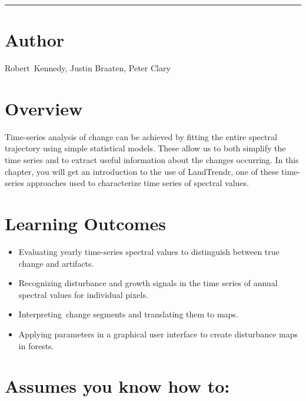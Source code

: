 \documentclass[
  letterpaper,
  DIV=11,
  numbers=noendperiod]{scrreprt}
\providecommand{\tightlist}{%
  \setlength{\itemsep}{0pt}\setlength{\parskip}{0pt}}\usepackage{longtable,booktabs,array}
\begin{document}
\begin{center}\rule{0.5\linewidth}{0.5pt}\end{center}

\hypertarget{author-10}{%
\section*{Author}\label{author-10}}


Robert~Kennedy, Justin Braaten, Peter Clary

\hypertarget{overview-12}{%
\section*{Overview}\label{overview-12}}


Time-series analysis of change can be achieved by fitting the entire
spectral trajectory using simple statistical models. These allow us to
both simplify the time series and to extract useful information about
the changes occurring. In this chapter, you will get an introduction to
the use of LandTrendr, one of these time-series approaches used to
characterize time series of spectral values.

\hypertarget{learning-outcomes-12}{%
\section*{Learning Outcomes}\label{learning-outcomes-12}}


\begin{itemize}
\tightlist
\item
  Evaluating yearly time-series spectral values to distinguish between
  true change and artifacts.
\item
  Recognizing disturbance and growth signals in the time series of
  annual spectral values for individual pixels.
\item
  Interpreting~change segments and translating them to maps.
\item
  Applying parameters in a graphical user interface to create
  disturbance maps in forests.
\end{itemize}

\hypertarget{assumes-you-know-how-to-12}{%
\section*{Assumes you know how to:}\label{assumes-you-know-how-to-12}}
\end{document}
